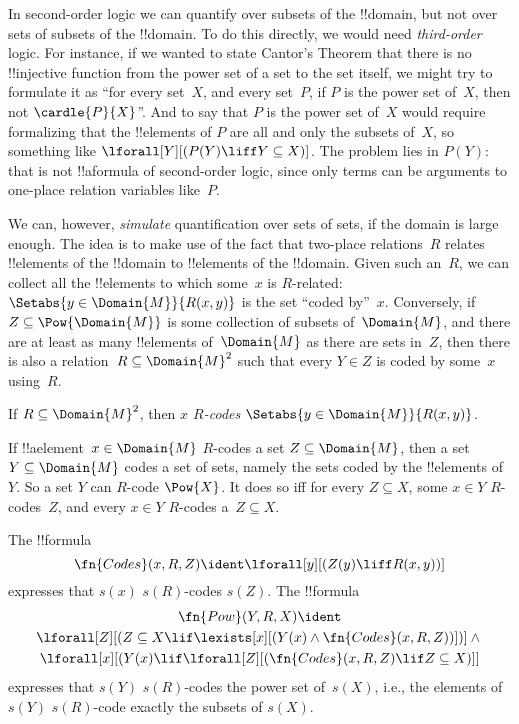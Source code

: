 \documentclass[../../../include/open-logic-section]{subfiles}
\begin{document}

\begin{explain}
In second-order logic we can quantify over subsets of the !!{domain},
but not over sets of subsets of the !!{domain}. To do this directly,
we would need \emph{third-order} logic.  For instance, if we wanted to
state Cantor's Theorem that there is no !!{injective} function from
the power set of a set to the set itself, we might try to formulate it
as ``for every set~$X$, and every set~$P$, if $P$ is the power set
of~$X$, then not $\cardle{P}{X}$''. And to say that $P$ is the power set
of~$X$ would require formalizing that the !!{element}s of $P$ are all
and only the subsets of~$X$, so something like $\lforall[Y][(P(Y)
  \liff Y \subseteq X)]$. The problem lies in $P(Y)$: that is not
!!a{formula} of second-order logic, since only terms can be arguments
to one-place relation variables like~$P$.

We can, however, \emph{simulate} quantification over sets of sets, if
the domain is large enough.  The idea is to make use of the fact that
two-place relations~$R$ relates !!{element}s of the !!{domain} to
!!{element}s of the !!{domain}. Given such an~$R$, we can collect all
the !!{element}s to which some~$x$ is $R$-related: $\Setabs{y \in
  \Domain{M}}{R(x,y)}$ is the set ``coded by''~$x$.  Conversely, if
$Z \subseteq \Pow{\Domain{M}}$ is some collection of subsets
of~$\Domain{M}$, and there are at least as many !!{element}s
of~$\Domain{M}$ as there are sets in~$Z$, then there is also a
relation~$R \subseteq \Domain{M}^2$ such that every $Y \in Z$ is coded
by some~$x$ using~$R$.
\end{explain}

\begin{defn}
If $R \subseteq \Domain{M}^2$, then \emph{$x$ $R$-codes} $\Setabs{y
  \in \Domain{M}}{R(x, y)}$.
\end{defn}

If !!a{element}~$x \in \Domain{M}$ $R$-codes a set $Z \subseteq
\Domain{M}$, then a set $Y \subseteq \Domain{M}$ codes a set of sets,
namely the sets coded by the !!{element}s of~$Y$.  So a set $Y$ can
$R$-code $\Pow{X}$. It does so iff for every $Z \subseteq X$, some $x
\in Y$ $R$-codes~$Z$, and every $x \in Y$ $R$-codes a~$Z \subseteq X$.

\begin{prop}
The !!{formula}
  \[
  \fn{Codes}(x, R, Z) \ident \lforall[y][(Z(y) \liff
    R(x, y))]
  \]
expresses that $s(x)$ $s(R)$-codes $s(Z)$.  The
!!{formula} 
\begin{multline*}
  \fn{Pow}(Y, R, X) \ident \\
  \lforall[Z][(Z \subseteq X \lif \lexists[x][(Y(x) \land
    \fn{Codes}(x, R, Z))])] \land {} \\ \lforall[x][(Y(x) \lif
  \lforall[Z][(\fn{Codes}(x, R, Z) \lif Z \subseteq X)]]
\end{multline*}
expresses that $s(Y)$ $s(R)$-codes the power set of~$s(X)$, i.e., the
elements of $s(Y)$ $s(R)$-code exactly the subsets of $s(X)$.
\end{prop}
\end{document}
